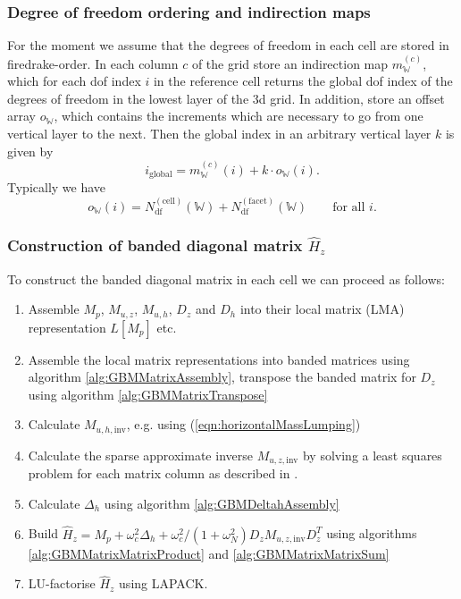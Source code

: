 \documentclass[10pt]{article}
\newcommand{\Wspace}{\mathbb{W}}
\begin{document}
\subsubsection{Degree of freedom ordering and indirection maps}
For the moment we assume that the degrees of freedom in each cell are stored in firedrake-order. In each column $c$ of the grid store an indirection map $m_{\Wspace}^{(c)}$, which for each dof index $i$ in the reference cell returns the global dof index of the degrees of freedom in the lowest layer of the 3d grid. In addition, store an offset array $o_{\Wspace}$, which contains the increments which are necessary to go from one vertical layer to the next. Then the global index in an arbitrary vertical layer $k$ is given by
\begin{equation}
  i_{\text{global}} = m_{\Wspace}^{(c)}(i)+k\cdot o_{\Wspace}(i).
\end{equation}
Typically we have
\begin{equation}
  o_{\Wspace}(i)=N_{\text{df}}^{(\text{cell})}(\Wspace)+N_{\text{df}}^{(\text{facet})}(\Wspace)\qquad\text{for all $i$}.
\end{equation}
\newcommand{\Ndfrow}{N_{\text{df}}(\Wspace_{\text{row}})}
\newcommand{\Ndfcellrow}{N_{\text{df}}^{(\text{cell})}(\Wspace_{\text{row}})}
\newcommand{\Ndffacetrow}{N_{\text{df}}^{(\text{facet})}(\Wspace_{\text{row}})}
\newcommand{\Ndfcol}{N_{\text{df}}(\Wspace_{\text{row}})}
\newcommand{\Ndfcellcol}{N_{\text{df}}^{(\text{cell})}(\Wspace_{\text{col}})}
\newcommand{\Ndffacetcol}{N_{\text{df}}^{(\text{facet})}(\Wspace_{\text{col}})}
\subsubsection{Construction of banded diagonal matrix $\hat{H}_z$}
To construct the banded diagonal matrix in each cell we can proceed as follows:
\begin{enumerate}
  \item Assemble $M_p$, $M_{u,z}$, $M_{u,h}$, $D_z$ and $D_h$ into their local matrix (LMA) representation $L[M_p]$ etc.
  \item Assemble the local matrix representations into banded matrices using algorithm \ref{alg:GBMMatrixAssembly}, transpose the banded matrix for $D_z$ using algorithm \ref{alg:GBMMatrixTranspose}
  \item Calculate $M_{u,h,\text{inv}}$, e.g. using (\ref{eqn:horizontalMassLumping})
  \item Calculate the sparse approximate inverse $M_{u,z,\text{inv}}$ by solving a least squares problem for each matrix column as described in \cite{Grote1997}.
  \item Calculate $\Delta_h$ using algorithm \ref{alg:GBMDeltahAssembly}
  \item Build $\hat{H}_z = M_p+\omega_c^2\Delta_h+\omega_c^2/(1+\omega_N^2) D_z M_{u,z,\text{inv}}D_z^T$ using algorithms \ref{alg:GBMMatrixMatrixProduct} and \ref{alg:GBMMatrixMatrixSum}
  \item LU-factorise $\hat{H}_z$ using LAPACK.
\end{enumerate}
\end{document}
